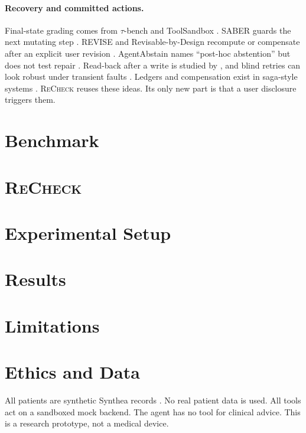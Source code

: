 \documentclass[10pt,twocolumn]{article}
\newcommand{\recheck}{\textsc{ReCheck}}
\begin{document}
\paragraph{Recovery and committed actions.} Final-state grading comes from $\tau$-bench and ToolSandbox \citep{yao2024taubench,barres2025tau2,lu2024toolsandbox}. SABER guards the next mutating step \citep{cuadron2025saber}. REVISE and Revisable-by-Design recompute or compensate after an explicit user revision \citep{qi2026revise,zhai2026revisable}. AgentAbstain names ``post-hoc abstention'' but does not test repair \citep{liu2026agentabstain}. Read-back after a write is studied by \citet{mansoor2026verified}, and blind retries can look robust under transient faults \citep{chen2026bench2robust}. Ledgers and compensation exist in saga-style systems \citep{chang2025sagallm,patil2024goex}. \recheck{} reuses these ideas. Its only new part is that a user disclosure triggers them.

\section{Benchmark}\label{sec:bench}


\section{\recheck{}}\label{sec:method}


\section{Experimental Setup}\label{sec:setup}


\section{Results}\label{sec:results}


\section{Limitations}


\section{Ethics and Data}
All patients are synthetic Synthea records \citep{walonoski2018synthea}. No real patient data is used. All tools act on a sandboxed mock backend. The agent has no tool for clinical advice. This is a research prototype, not a medical device.



\end{document}

